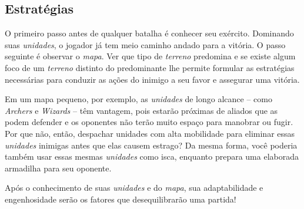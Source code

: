 \documentclass{article}
\begin{document}
\subsection{Estratégias}
O primeiro passo antes de qualquer batalha é conhecer seu exército. Dominando suas \emph{unidades}, o jogador já tem meio caminho andado para a vitória. O passo seguinte é observar o \emph{mapa}. Ver que tipo de \emph{terreno} predomina e se existe algum foco de um \emph{terreno} distinto do predominante lhe permite formular as estratégias necessárias para conduzir as ações do inimigo a seu favor e assegurar uma vitória. \par

Em um mapa pequeno, por exemplo, as \emph{unidades} de longo alcance -- como \emph{Archers} e \emph{Wizards} -- têm vantagem, pois estarão próximas de aliados que as podem defender e os oponentes não terão muito espaço para manobrar ou fugir. Por que não, então, despachar unidades com alta mobilidade para eliminar essas \emph{unidades} inimigas antes que elas causem estrago? Da mesma forma, você poderia também usar essas mesmas \emph{unidades} como isca, enquanto prepara uma elaborada armadilha para seu oponente. \par

Após o conhecimento de suas \emph{unidades} e do \emph{mapa}, sua adaptabilidade e engenhosidade serão os fatores que desequilibrarão uma partida!
\end{document}
